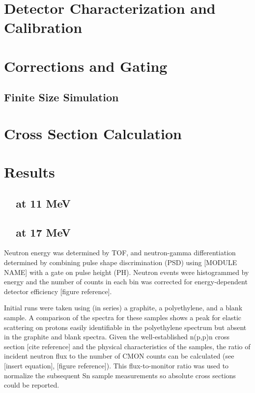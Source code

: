 \section{Detector Characterization and Calibration}
\section{Corrections and Gating}
\subsection{Finite Size Simulation}
\section{Cross Section Calculation}
\section{Results}
\subsection{\snTwelveFour\ \el\ at 11 MeV}
\subsection{\snTwelveFour\ \el\ at 17 MeV}

Neutron energy was determined by TOF, and neutron-gamma differentiation
determined by combining pulse shape discrimination (PSD) using [MODULE NAME] with
a gate on pulse height (PH). Neutron events were histogrammed by energy and the
number of counts in each bin was corrected for energy-dependent detector
efficiency [figure reference].

Initial runs were taken using (in series) a graphite, a polyethylene, and a blank
sample. A comparison of the spectra for these samples shows a peak for elastic
scattering on protons easily identifiable in the polyethylene spectrum but
absent in the graphite and blank spectra. Given the well-established n(p,p)n
cross section [cite reference] and the physical characteristics of the samples,
the ratio of incident neutron flux to the number of CMON counts can be calculated
(see [insert equation], [figure reference]). This flux-to-monitor ratio was used to normalize the
subsequent Sn sample measurements so absolute cross sections could be reported.

